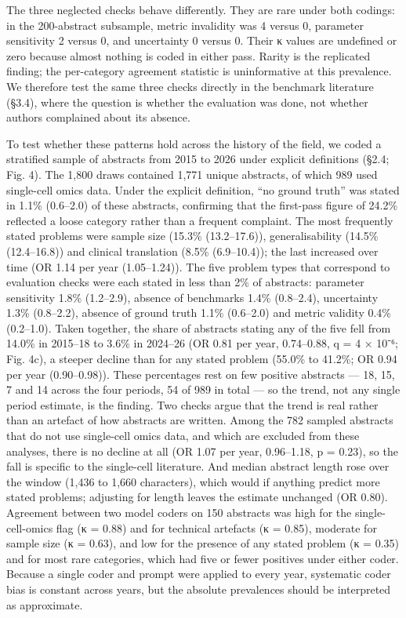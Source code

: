 \documentclass{article}
\begin{document}
The three neglected checks behave differently. They are rare under both
codings: in the 200-abstract subsample, metric invalidity was 4 versus
0, parameter sensitivity 2 versus 0, and uncertainty 0 versus 0. Their κ
values are undefined or zero because almost nothing is coded in either
pass. Rarity is the replicated finding; the per-category agreement
statistic is uninformative at this prevalence. We therefore test the
same three checks directly in the benchmark literature (§3.4), where the
question is whether the evaluation was done, not whether authors
complained about its absence.

To test whether these patterns hold across the history of the field, we
coded a stratified sample of abstracts from 2015 to 2026 under explicit
definitions (§2.4; Fig. 4). The 1,800 draws contained 1,771 unique
abstracts, of which 989 used single-cell omics data. Under the explicit
definition, ``no ground truth'' was stated in 1.1\% (0.6--2.0) of these
abstracts, confirming that the first-pass figure of 24.2\% reflected a
loose category rather than a frequent complaint. The most frequently
stated problems were sample size (15.3\% (13.2--17.6)), generalisability
(14.5\% (12.4--16.8)) and clinical translation (8.5\% (6.9--10.4)); the
last increased over time (OR 1.14 per year (1.05--1.24)). The five
problem types that correspond to evaluation checks were each stated in
less than 2\% of abstracts: parameter sensitivity 1.8\% (1.2--2.9),
absence of benchmarks 1.4\% (0.8--2.4), uncertainty 1.3\% (0.8--2.2),
absence of ground truth 1.1\% (0.6--2.0) and metric validity 0.4\%
(0.2--1.0). Taken together, the share of abstracts stating any of the
five fell from 14.0\% in 2015--18 to 3.6\% in 2024--26 (OR 0.81 per
year, 0.74--0.88, q = 4 × 10⁻⁶; Fig. 4c), a steeper decline than for any
stated problem (55.0\% to 41.2\%; OR 0.94 per year (0.90--0.98)). These
percentages rest on few positive abstracts --- 18, 15, 7 and 14 across
the four periods, 54 of 989 in total --- so the trend, not any single
period estimate, is the finding. Two checks argue that the trend is real
rather than an artefact of how abstracts are written. Among the 782
sampled abstracts that do not use single-cell omics data, and which are
excluded from these analyses, there is no decline at all (OR 1.07 per
year, 0.96--1.18, p = 0.23), so the fall is specific to the single-cell
literature. And median abstract length rose over the window (1,436 to
1,660 characters), which would if anything predict more stated problems;
adjusting for length leaves the estimate unchanged (OR 0.80). Agreement
between two model coders on 150 abstracts was high for the
single-cell-omics flag (κ = 0.88) and for technical artefacts (κ =
0.85), moderate for sample size (κ = 0.63), and low for the presence of
any stated problem (κ = 0.35) and for most rare categories, which had
five or fewer positives under either coder. Because a single coder and
prompt were applied to every year, systematic coder bias is constant
across years, but the absolute prevalences should be interpreted as
approximate.
\end{document}
